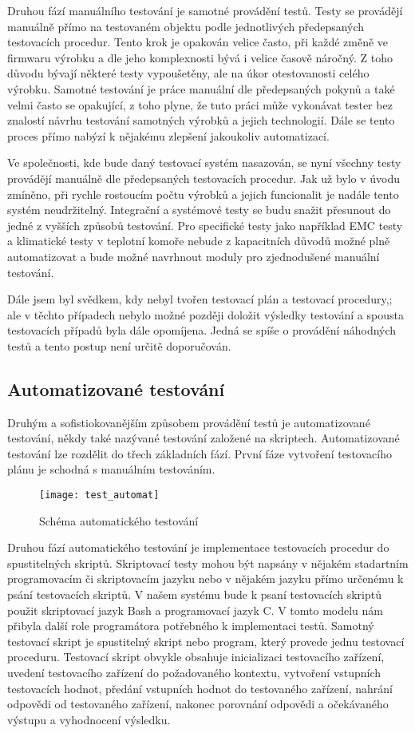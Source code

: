 Druhou fází manuálního testování je samotné provádění testů. Testy se provádějí manuálně přímo na testovaném objektu podle jednotlivých předepsaných testovacích procedur. Tento krok je opakován velice často, při každé změně ve firmwaru výrobku a dle jeho komplexnosti bývá i velice časově náročný. Z toho důvodu bývají některé testy vypoušetěny, ale na úkor otestovanosti celého výrobku. Samotné testování je práce manuální dle předepsaných pokynů a také velmi často se opakující, z toho plyne, že tuto práci může vykonávat tester bez znalostí návrhu testování samotných výrobků a jejich technologií. Dále se tento proces přímo nabýzí k nějakému zlepšení jakoukoliv automatizací.

Ve společnosti, kde bude daný testovací systém nasazován, se nyní všechny testy provádějí manuálně dle předepsaných testovacích procedur. Jak už bylo v úvodu zmíněno, při rychle rostoucím počtu výrobků a jejich funcionalit je nadále tento systém neudržitelný. Integrační a systémové testy se budu snažit přesunout do jedné z vyšších způsobů testování. Pro specifické testy jako například EMC testy a klimatické testy v teplotní komoře nebude z kapacitních důvodů možné plně automatizovat a bude možné navrhnout moduly pro zjednodušené manuální testování.

Dále jsem byl svědkem, kdy nebyl tvořen testovací plán a testovací procedury,; ale v těchto případech nebylo možné později doložit výsledky testování a spousta testovacích případů byla dále opomíjena. Jedná se spíše o provádění náhodných testů a tento postup není určitě doporučován.

\subsection{Automatizované testování}
Druhým a sofistiokovanějším způsobem provádění testů je automatizované testování, někdy také nazývané testování založené na skriptech. Automatizované testování lze rozdělit do třech základních fází. První fáze vytvoření testovacího plánu je schodná s manuálním testováním.

\begin{figure}[h]
  \centering
  \texttt{[image: test\_automat]}
  \caption{Schéma automatického testování}
  \label{fig:test_automat}
\end{figure}

Druhou fází automatického testování je implementace testovacích procedur do spustitelných skriptů. Skriptovací testy mohou být napsány v nějakém stadartním programovacím či skriptovacím jazyku nebo v nějakém jazyku přímo určenému k psání testovacích skriptů. V našem systému bude k psaní testovacích skriptů použit skriptovací jazyk Bash a programovací jazyk C. V tomto modelu nám přibyla další role programátora potřebného k implementaci testů. Samotný testovací skript je spustitelný skript nebo program, který provede jednu testovací proceduru. Testovací skript obvykle obsahuje inicializaci testovacího zařízení, uvedení testovacího zařízení do požadovaného kontextu, vytvoření vstupních testovacích hodnot, předání vstupních hodnot do testovaného zařízení, nahrání odpovědi od testovaného zařízení, nakonec porovnání odpovědi a očekávaného výstupu a vyhodnocení výsledku.

